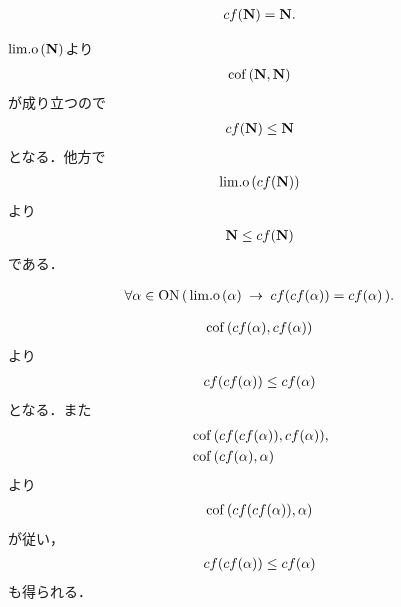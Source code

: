 	\begin{screen}
		\begin{thm}
			\begin{align}
				cf(\mathbf{N}) = \mathbf{N}.
			\end{align}
		\end{thm}
	\end{screen}
	
	\begin{sketch}
		$\mathrm{lim.o}\hspace{0.15em}(\mathbf{N})$より
		\begin{align}
			\operatorname*{cof}\hspace{0.15em}(\mathbf{N},\mathbf{N})
		\end{align}
		が成り立つので
		\begin{align}
			cf(\mathbf{N}) \leq \mathbf{N}
		\end{align}
		となる．他方で
		\begin{align}
			\mathrm{lim.o}\hspace{0.15em}(cf(\mathbf{N}))
		\end{align}
		より
		\begin{align}
			\mathbf{N} \leq cf(\mathbf{N})
		\end{align}
		である．
		\QED
	\end{sketch}
	
	\begin{screen}
		\begin{thm}[共終数は正則である]
			\begin{align}
				\forall \alpha \in \mathrm{ON}\, 
				(\, \mathrm{lim.o}\hspace{0.15em}(\alpha) \hspace{0.25em}\rightarrow\hspace{0.25em} cf(cf(\alpha)) = cf(\alpha)\, ).
			\end{align}
		\end{thm}
	\end{screen}
	
	\begin{sketch}
		\begin{align}
			\operatorname*{cof}\hspace{0.15em}(cf(\alpha),cf(\alpha))
		\end{align}
		より
		\begin{align}
			cf(cf(\alpha)) \leq cf(\alpha)
		\end{align}
		となる．また
		\begin{align}
			&\operatorname*{cof}\hspace{0.15em}(cf(cf(\alpha)),cf(\alpha)), \\
			&\operatorname*{cof}\hspace{0.15em}(cf(\alpha),\alpha)
		\end{align}
		より
		\begin{align}
			\operatorname*{cof}\hspace{0.15em}(cf(cf(\alpha)),\alpha)
		\end{align}
		が従い，
		\begin{align}
			cf(cf(\alpha)) \leq cf(\alpha)
		\end{align}
		も得られる．
		\QED
	\end{sketch}
	